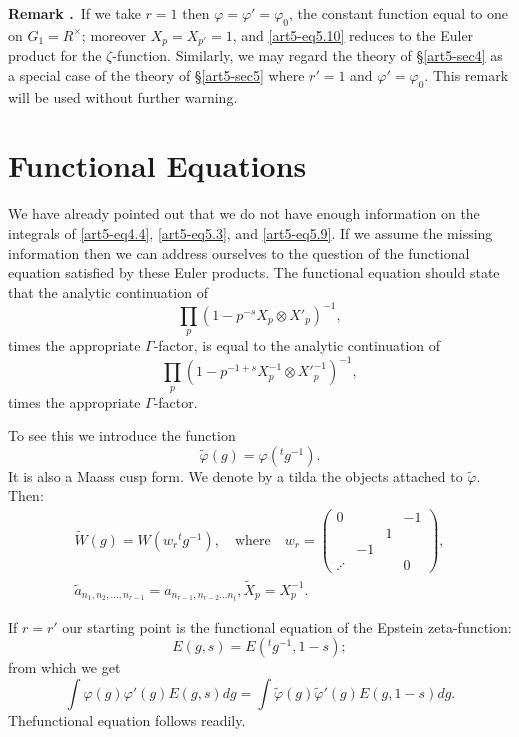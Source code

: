 \medskip
\noindent
{\bf Remark .\label{art5-thm5.11}}~If we take $r=1$ then $\varphi=\varphi'=\varphi_{0}$, the constant function equal to one on $G_{1}=R^{\times}$; moreover $X_{p}=X_{p'}=1$, and \eqref{art5-eq5.10} reduces to the Euler product for the $\zeta$-function. Similarly, we may regard the theory of \S\ref{art5-sec4} as a special case of the theory of \S\ref{art5-sec5} where $r'=1$ and $\varphi'=\varphi_{0}$. This remark will be used without further warning.

\eject

\section{Functional Equations}\label{art5-sec6}

We have already pointed out that we do not have enough information on the integrals of \eqref{art5-eq4.4}, \eqref{art5-eq5.3}, and \eqref{art5-eq5.9}. If we assume the missing information then we can address ourselves to the question of the functional equation satisfied by these Euler products. The functional equation should state that the analytic continuation of 
$$
\prod\limits_{p}(1-p^{-s}X_{p}\otimes X'_{p})^{-1},
$$
times the appropriate $\Gamma$-factor, is equal to the analytic continuation of 
$$
\prod\limits_{p}(1-p^{-1+s}X^{-1}_{p}\otimes {X'}^{-1}_{p})^{-1},
$$
times the appropriate $\Gamma$-factor.

To see this we introduce the function
$$
\widetilde{\varphi}(g)=\varphi({}^{t}g^{-1}).
$$
It is also a Maass cusp form. We denote by a tilda the objects attached to $\widetilde{\varphi}$. Then:
\begin{gather*}
\widetilde{W}(g)=W(w_{r}{}^{t}g^{-1}),\quad\text{where}\quad w_{r}=
\left(
\begin{matrix}
0 & & & -1\\
 & & 1 &\\
 & -1 & & \\
\iddots & & & 0
\end{matrix}
\right),\\
\widetilde{a}_{n_{1},n_{2},\ldots,n_{r-1}}=a_{n_{r-1},n_{r-2}\ldots n_{t}},  \widetilde{X}_{p}=X^{-1}_{p}.
\end{gather*}

If $r=r'$ our starting point is the functional equation of the Epstein zeta-function:
$$
E(g,s)=E({}^{t}g^{-1},1-s);
$$
from which we get
$$
\int \varphi(g)\varphi'(g)E(g,s)dg=\int \widetilde{\varphi}(g)\widetilde{\varphi}'(g)E(g,1-s)dg.
$$
The\pageoriginale functional equation follows readily.

